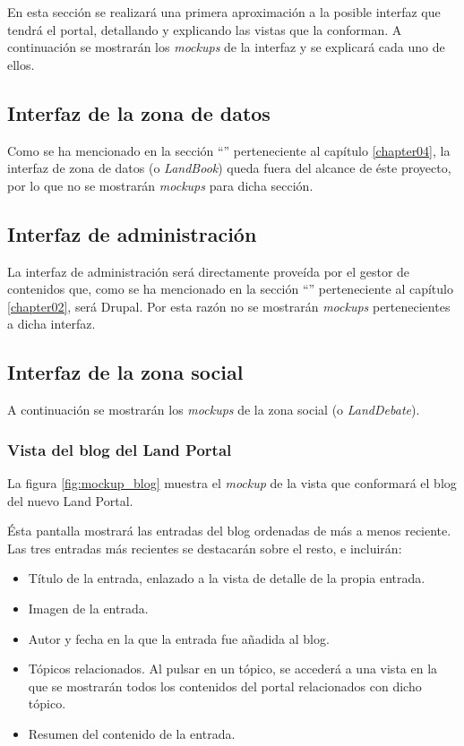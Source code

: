 En esta sección se realizará una primera aproximación a la posible interfaz que tendrá el portal, detallando y explicando las vistas que la conforman.  A continuación se mostrarán los \textit{mockups} de la interfaz y se explicará cada uno de ellos.



\subsection{Interfaz de la zona de datos}
Como se ha mencionado en la sección ``'' perteneciente al capítulo \ref{chapter04}, la interfaz de zona de datos (o \textit{LandBook}) queda fuera del alcance de éste proyecto, por lo que no se mostrarán \textit{mockups} para dicha sección.



\subsection{Interfaz de administración}
La interfaz de administración será directamente proveída por el gestor de contenidos que, como se ha mencionado en la sección ``'' perteneciente al capítulo \ref{chapter02}, será Drupal.  Por esta razón no se mostrarán \textit{mockups} pertenecientes a dicha interfaz.



\subsection{Interfaz de la zona social}
A continuación se mostrarán los \textit{mockups} de la zona social (o \textit{LandDebate}).


\subsubsection{Vista del blog del Land Portal}
\label{chapter04:mockup_blog}
La figura \ref{fig:mockup_blog} muestra el \textit{mockup} de la vista que conformará el blog del nuevo Land Portal.

Ésta pantalla mostrará las entradas del blog ordenadas de más a menos reciente.  Las tres entradas más recientes se destacarán sobre el resto, e incluirán:
\begin{itemize}
	\item Título de la entrada, enlazado a la vista de detalle de la propia entrada.
	\item Imagen de la entrada.
	\item Autor y fecha en la que la entrada fue añadida al blog.
	\item Tópicos relacionados.  Al pulsar en un tópico, se accederá a una vista en la que se mostrarán todos los contenidos del portal relacionados con dicho tópico.
	\item Resumen del contenido de la entrada.
\end{itemize}

